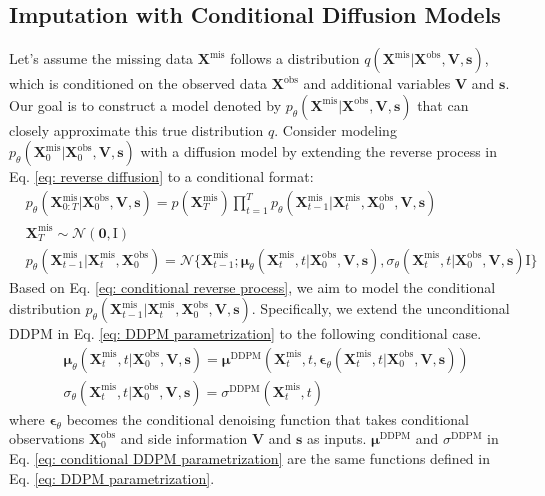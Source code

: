 \documentclass[11pt]{article}
\begin{document}
\subsection{Imputation with Conditional Diffusion Models}\label{sec: csdi}
Let's assume the missing data $\bm{X}^{\mathrm{mis}}$ follows a distribution $q(\bm{X}^{\mathrm{mis}}|\bm{X}^{\mathrm{obs}}, \bm{V}, \bm{s})$, which is conditioned on the observed data $\bm{X}^{\mathrm{obs}}$ and additional variables $\bm{V}$ and $\bm{s}$. Our goal is to construct a model denoted by $p_{\theta}(\bm{X}^{\mathrm{mis}}|\bm{X}^{\mathrm{obs}}, \bm{V}, \bm{s})$ that can closely approximate this true distribution $q$. Consider modeling $p_{\theta}(\bm{X}_0^{\mathrm{mis}}|\bm{X}_0^{\mathrm{obs}}, \bm{V}, \bm{s})$ with a diffusion model by extending the reverse process in Eq. \ref{eq: reverse diffusion} to a conditional format:
\begin{align}\label{eq: conditional reverse process}
	&p_{\theta}(\bm{X}_{0:T}^{\mathrm{mis}}|\bm{X}_0^{\mathrm{obs}}, \bm{V}, \bm{s})=p(\bm{X}_T^{\mathrm{mis}})\prod_{t=1}^T p_{\theta}(\bm{X}_{t-1}^{\mathrm{mis}}|\bm{X}_t^{\mathrm{mis}},\bm{X}_0^{\mathrm{obs}},\bm{V},\bm{s})\\
	&\bm{X}_T^{\mathrm{mis}}\sim \mathcal{N}(\bm{0},\bm{\mathrm{I}})\\
	&p_{\theta}(\bm{X}_{t-1}^{\mathrm{mis}}|\bm{X}_t^{\mathrm{mis}},\bm{X}_0^{\mathrm{obs}})=\mathcal{N}\{\bm{X}_{t-1}^{\mathrm{mis}};\bm{\mu}_{\theta}(\bm{X}_t^{\mathrm{mis}}, t|\bm{X}_0^{\mathrm{obs}},\bm{V},\bm{s}), \sigma_{\theta}(\bm{X}_t^{\mathrm{mis}},t|\bm{X}_0^{\mathrm{obs}},\bm{V},\bm{s})\bm{\mathrm{I}}\}
\end{align}
Based on Eq. \ref{eq: conditional reverse process}, we aim to model the conditional distribution $p_{\theta}(\bm{X}_{t-1}^{\mathrm{mis}}|\bm{X}_t^{\mathrm{mis}},\bm{X}_0^{\mathrm{obs}},\bm{V}, \bm{s})$. Specifically, we extend the unconditional DDPM in Eq. \ref{eq: DDPM parametrization} to the following conditional case. 
\begin{align}\label{eq: conditional DDPM parametrization}
	&\bm{\mu}_{\theta}(\bm{X}_t^{\mathrm{mis}}, t|\bm{X}_0^{\mathrm{obs}},\bm{V},\bm{s})=\bm{\mu}^{\mathrm{DDPM}}(\bm{X}_t^{\mathrm{mis}},t,\bm{\epsilon}_{\theta}(\bm{X}_t^{\mathrm{mis}},t|\bm{X}_0^{\mathrm{obs}},\bm{V},\bm{s}))\\
	&\sigma_{\theta}(\bm{X}_t^{\mathrm{mis}},t|\bm{X}_0^{\mathrm{obs}},\bm{V},\bm{s})=\sigma^{\mathrm{DDPM}}(\bm{X}_t^{\mathrm{mis}},t)
\end{align}
where $\bm{\epsilon}_{\theta}$ becomes the conditional denoising function that takes conditional observations $\bm{X}_0^{\mathrm{obs}}$ and side information $\bm{V}$ and $\bm{s}$ as inputs. $\bm{\mu}^{\mathrm{DDPM}}$ and $\sigma^{\mathrm{DDPM}}$ in Eq. \ref{eq: conditional DDPM parametrization} are the same functions defined in Eq. \ref{eq: DDPM parametrization}. 
 
\end{document}
